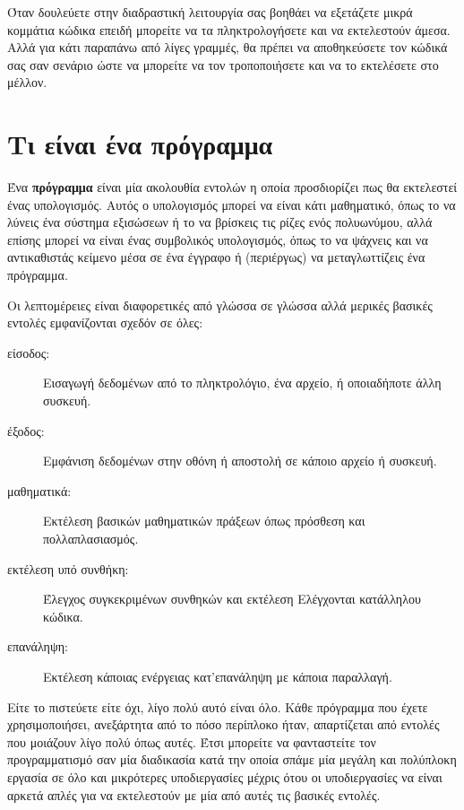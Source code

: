 \documentclass[10pt]{book}
\begin{document}

 Όταν δουλεύετε στην διαδραστική λειτουργία σας βοηθάει να εξετάζετε
μικρά κομμάτια κώδικα επειδή μπορείτε να τα πληκτρολογήσετε και να εκτελεστούν
άμεσα.  Αλλά για κάτι παραπάνω από λίγες γραμμές, θα πρέπει να αποθηκεύσετε τον
κώδικά σας σαν σενάριο ώστε να μπορείτε να τον τροποποιήσετε και να το εκτελέσετε
στο μέλλον.


\section{ Τι είναι ένα πρόγραμμα}

Ένα {\bf πρόγραμμα} είναι μία ακολουθία εντολών η οποία προσδιορίζει
πως θα εκτελεστεί ένας υπολογισμός.  Αυτός ο υπολογισμός μπορεί να είναι
κάτι μαθηματικό, όπως το να λύνεις ένα σύστημα εξισώσεων ή το να βρίσκεις
τις ρίζες ενός πολυωνύμου, αλλά επίσης μπορεί να είναι ένας συμβολικός
υπολογισμός, όπως το να ψάχνεις και να αντικαθιστάς κείμενο μέσα σε ένα
έγγραφο ή (περιέργως) να μεταγλωττίζεις ένα πρόγραμμα.


Οι λεπτομέρειες είναι διαφορετικές από γλώσσα σε γλώσσα αλλά μερικές βασικές
εντολές εμφανίζονται σχεδόν σε όλες:

\begin{description}
\item[είσοδος:]   Εισαγωγή δεδομένων από το πληκτρολόγιο, ένα αρχείο, ή οποιαδήποτε
άλλη συσκευή.

\item[έξοδος:]   Εμφάνιση δεδομένων στην οθόνη ή αποστολή σε κάποιο αρχείο
ή συσκευή.

\item[μαθηματικά:]   Εκτέλεση βασικών μαθηματικών πράξεων όπως πρόσθεση και
πολλαπλασιασμός.

\item[εκτέλεση υπό συνθήκη:]   Έλεγχος συγκεκριμένων συνθηκών και εκτέλεση Ελέγχονται κατάλληλου κώδικα.

\item[επανάληψη:]   Εκτέλεση κάποιας ενέργειας κατ'επανάληψη με κάποια παραλλαγή.

\end{description}

Είτε το πιστεύετε είτε όχι, λίγο πολύ αυτό είναι όλο.  Κάθε πρόγραμμα
που έχετε χρησιμοποιήσει, ανεξάρτητα από το πόσο περίπλοκο ήταν,
απαρτίζεται από εντολές που μοιάζουν λίγο πολύ όπως αυτές.  Έτσι
μπορείτε να φανταστείτε τον προγραμματισμό σαν μία διαδικασία κατά
την οποία σπάμε μία μεγάλη και πολύπλοκη εργασία σε όλο και μικρότερες
υποδιεργασίες μέχρις ότου οι υποδιεργασίες να είναι αρκετά απλές για
να εκτελεστούν με μία από αυτές τις βασικές εντολές.
\end{document}
